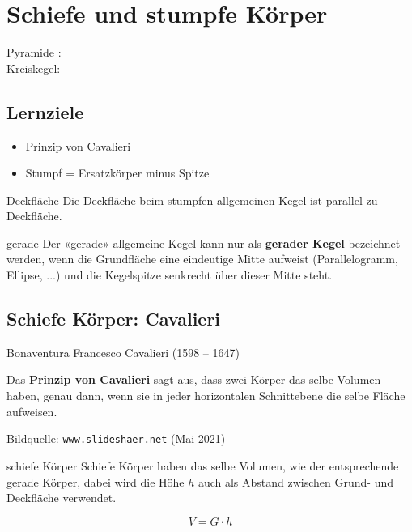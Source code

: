 \section{Schiefe und stumpfe Körper}

Pyramide : \\
Kreiskegel: \\

\subsection*{Lernziele}
\begin{itemize}
\item Prinzip von Cavalieri
\item Stumpf = Ersatzkörper minus Spitze
\end{itemize}


\begin{bemerkung}{Deckfläche}{}
Die Deckfläche beim stumpfen allgemeinen Kegel ist parallel zu Deckfläche.
\end{bemerkung}

\begin{bemerkung}{gerade}{}
  Der «gerade» allgemeine Kegel kann nur als \textbf{gerader Kegel} bezeichnet werden, wenn die Grundfläche eine eindeutige Mitte aufweist (Parallelogramm, Ellipse, ...) und die Kegelspitze senkrecht über dieser Mitte steht.
\end{bemerkung}
  \newpage


\subsection{Schiefe Körper: Cavalieri}
Bonaventura Francesco Cavalieri (1598 – 1647)

Das \textbf{Prinzip von Cavalieri} sagt aus, dass zwei Körper das
selbe Volumen haben, genau dann, wenn sie in jeder horizontalen
Schnittebene die selbe Fläche aufweisen.

Bildquelle: \texttt{www.slideshaer.net} (Mai 2021)
\vspace{9mm}

\begin{gesetz}{schiefe Körper}{}
  Schiefe Körper haben das selbe Volumen, wie der entsprechende gerade Körper, dabei wird die Höhe $h$ auch als Abstand zwischen Grund- und Deckfläche verwendet.

  $$V = G\cdot{} h$$
\end{gesetz}

